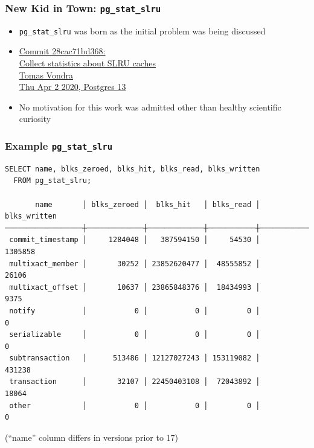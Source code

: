 \begin{frame}
  \frametitle{New Kid in Town: \texttt{pg\_stat\_slru}}
  \begin{itemize}
    \item \texttt{pg\_stat\_slru} was born as the initial problem was being discussed
    \item {\linksize \href{https://git.postgresql.org/cgit/postgresql.git/commit/?id=28cac71bd368}
      {Commit 28cac71bd368: \faExternalLink \\
      Collect statistics about SLRU caches \\
      Tomas Vondra \\
      Thu Apr 2 2020, Postgres 13}}
    \item No motivation for this work was admitted other than healthy scientific curiosity
  \end{itemize}
\end{frame}

\begin{frame}[fragile]
  \frametitle{Example \texttt{pg\_stat\_slru}}

  \linksize
\begin{verbatim}
SELECT name, blks_zeroed, blks_hit, blks_read, blks_written
  FROM pg_stat_slru;

       name       │ blks_zeroed │  blks_hit   │ blks_read │ blks_written 
──────────────────┼─────────────┼─────────────┼───────────┼──────────────
 commit_timestamp │     1284048 │   387594150 │     54530 │      1305858
 multixact_member │       30252 │ 23852620477 │  48555852 │        26106
 multixact_offset │       10637 │ 23865848376 │  18434993 │         9375
 notify           │           0 │           0 │         0 │            0
 serializable     │           0 │           0 │         0 │            0
 subtransaction   │      513486 │ 12127027243 │ 153119082 │       431238
 transaction      │       32107 │ 22450403108 │  72043892 │        18064
 other            │           0 │           0 │         0 │            0
\end{verbatim}
  \linksize (``name'' column differs in versions prior to 17)

\end{frame}

